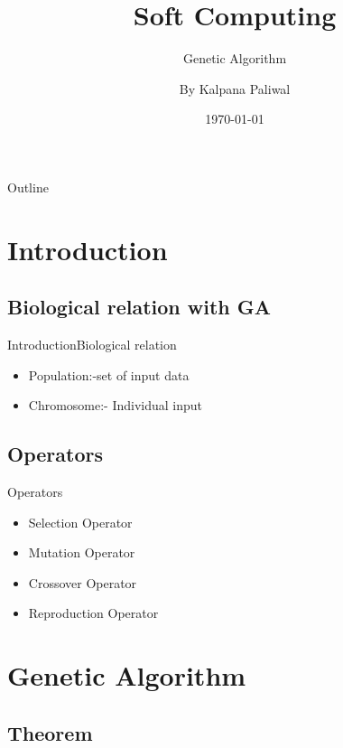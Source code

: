 \documentclass{beamer}
\title{Soft Computing}
\subtitle{Genetic Algorithm}
\author{By Kalpana Paliwal}
\date{\today}
\begin{document}
\begin{frame}
  \titlepage
\end{frame}

\begin{frame}{Outline}
  \tableofcontents
 
\end{frame}

\section{Introduction}

\subsection{Biological relation with GA}

\begin{frame}{Introduction}{Biological relation}
  \begin{itemize}
  \item {
   Population:-set of input data
  }
  \item {
  Chromosome:- Individual input
  }
  \end{itemize}
\end{frame}

\subsection{Operators}


\begin{frame}{Operators}
  \begin{itemize}
  \item {
   Selection Operator
    \pause 
  }
  \item {   
   Mutation Operator
  }
 
  \item<3-> {
   Crossover Operator
  }
  \item<4-> {
  Reproduction Operator
  }
 
  
  \end{itemize}
\end{frame}

\section{Genetic Algorithm}

\subsection{Theorem}
\end{document}
